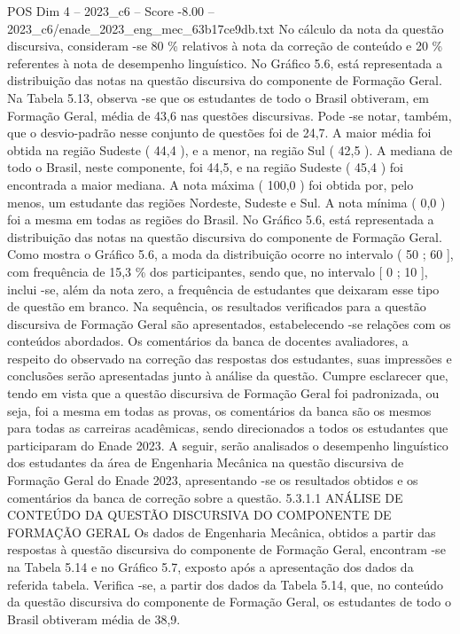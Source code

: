 \begin{textsample}{POS Dim 4 – 2023\_c6 – Score -8.00 – 2023\_c6/enade\_2023\_eng\_mec\_63b17ce9db.txt}
No cálculo da nota da questão discursiva, consideram -se 80 \% relativos à nota da correção de conteúdo e 20 \% referentes à nota de desempenho linguístico.
No Gráfico 5.6, está representada a distribuição das notas na questão discursiva do componente de Formação Geral.
Na Tabela 5.13, observa -se que os estudantes de todo o Brasil obtiveram, em Formação Geral, média de 43,6 nas questões discursivas.
Pode -se notar, também, que o desvio-padrão nesse conjunto de questões foi de 24,7.
A maior média foi obtida na região Sudeste ( 44,4 ), e a menor, na região Sul ( 42,5 ).
A mediana de todo o Brasil, neste componente, foi 44,5, e na região Sudeste ( 45,4 ) foi encontrada a maior mediana.
A nota máxima ( 100,0 ) foi obtida por, pelo menos, um estudante das regiões Nordeste, Sudeste e Sul.
A nota mínima ( 0,0 ) foi a mesma em todas as regiões do Brasil.
No Gráfico 5.6, está representada a distribuição das notas na questão discursiva do componente de Formação Geral.
Como mostra o Gráfico 5.6, a moda da distribuição ocorre no intervalo ( 50 ; 60 ], com frequência de 15,3 \% dos participantes, sendo que, no intervalo [ 0 ; 10 ], inclui -se, além da nota zero, a frequência de estudantes que deixaram esse tipo de questão em branco.
Na sequência, os resultados verificados para a questão discursiva de Formação Geral são apresentados, estabelecendo -se relações com os conteúdos abordados.
Os comentários da banca de docentes avaliadores, a respeito do observado na correção das respostas dos estudantes, suas impressões e conclusões serão apresentadas junto à análise da questão.
Cumpre esclarecer que, tendo em vista que a questão discursiva de Formação Geral foi padronizada, ou seja, foi a mesma em todas as provas, os comentários da banca são os mesmos para todas as carreiras acadêmicas, sendo direcionados a todos os estudantes que participaram do Enade 2023.
A seguir, serão analisados o desempenho linguístico dos estudantes da área de Engenharia Mecânica na questão discursiva de Formação Geral do Enade 2023, apresentando -se os resultados obtidos e os comentários da banca de correção sobre a questão. 5.3.1.1 ANÁLISE DE CONTEÚDO DA QUESTÃO DISCURSIVA DO COMPONENTE DE FORMAÇÃO GERAL Os dados de Engenharia Mecânica, obtidos a partir das respostas à questão discursiva do componente de Formação Geral, encontram -se na Tabela 5.14 e no Gráfico 5.7, exposto após a apresentação dos dados da referida tabela.
Verifica -se, a partir dos dados da Tabela 5.14, que, no conteúdo da questão discursiva do componente de Formação Geral, os estudantes de todo o Brasil obtiveram média de 38,9.

\end{textsample}
